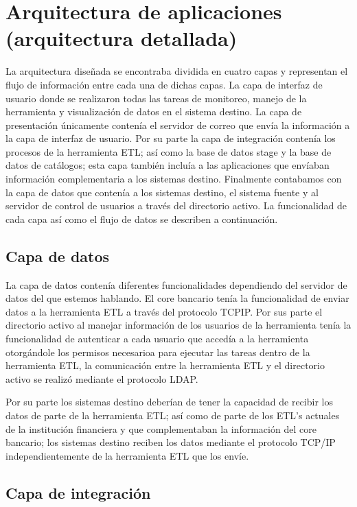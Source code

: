 \documentclass[a4paper,openright,12pt]{book}
\begin{document}
\section{Arquitectura de aplicaciones (arquitectura detallada)}

La arquitectura diseñada se encontraba dividida en cuatro capas y representan el
flujo de información entre cada una de dichas capas. La capa de interfaz de
usuario donde se realizaron todas las tareas de monitoreo, manejo de la
herramienta y visualización de datos en el sistema destino. La capa de
presentación únicamente contenía el servidor de correo que envía la información
a la capa de interfaz de usuario. Por su parte la capa de integración contenía
los procesos de la herramienta ETL; así como la base de datos stage y la base de
datos de catálogos; esta capa también incluía a las aplicaciones que envíaban
información complementaria a los sistemas destino. Finalmente contabamos con la
capa de datos que contenía a los sistemas destino, el sistema fuente y al
servidor de control de usuarios a través del directorio activo. La funcionalidad
de cada capa así como el flujo de datos se describen a continuación.

\subsection{Capa de datos}

La capa de datos contenía diferentes funcionalidades dependiendo del servidor de
datos del que estemos hablando. El core bancario tenía la funcionalidad de
enviar datos a la herramienta ETL a través del protocolo TCP\/IP. Por sus parte
el directorio activo al manejar información de los usuarios de la herramienta
tenía la funcionalidad de autenticar a cada usuario que accedía a la herramienta
otorgándole los permisos necesarioa para ejecutar las tareas dentro de la
herramienta ETL, la comunicación entre la herramienta ETL y el directorio activo
se realizó mediante el protocolo LDAP.

Por su parte los sistemas destino deberían de tener la capacidad de recibir los
datos de parte de la herramienta ETL; así como de parte de los ETL's actuales de
la institución financiera y que complementaban la información del core bancario;
los sistemas destino reciben los datos mediante el protocolo TCP/IP
independientemente de la herramienta ETL que los envíe.

\subsection{Capa de integración}
\end{document}
